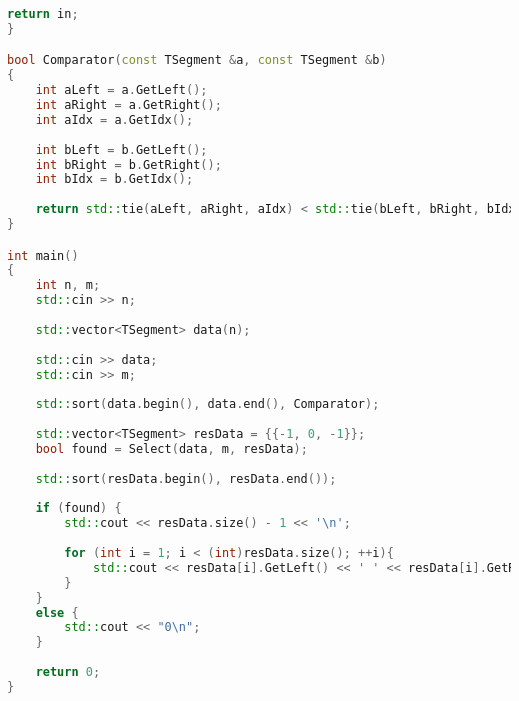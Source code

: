 \begin{lstlisting}[language=C++]
	return in;
}

bool Comparator(const TSegment &a, const TSegment &b) 
{
	int aLeft = a.GetLeft();
	int aRight = a.GetRight();
	int aIdx = a.GetIdx();
	
	int bLeft = b.GetLeft();
	int bRight = b.GetRight();
	int bIdx = b.GetIdx();
	
	return std::tie(aLeft, aRight, aIdx) < std::tie(bLeft, bRight, bIdx);
}

int main() 
{
	int n, m;
	std::cin >> n;
	
	std::vector<TSegment> data(n);
	
	std::cin >> data;
	std::cin >> m;
	
	std::sort(data.begin(), data.end(), Comparator);
	
	std::vector<TSegment> resData = {{-1, 0, -1}};
	bool found = Select(data, m, resData);
	
	std::sort(resData.begin(), resData.end());
	
	if (found) {
		std::cout << resData.size() - 1 << '\n';
		
		for (int i = 1; i < (int)resData.size(); ++i){
			std::cout << resData[i].GetLeft() << ' ' << resData[i].GetRight() << '\n';
		}
	} 
	else {
		std::cout << "0\n";
	}
	
	return 0;
}

\end{lstlisting}

\pagebreak

